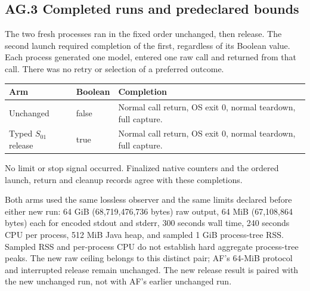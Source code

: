 \subsection*{AG.3 Completed runs and predeclared bounds}
The two fresh processes ran in the fixed order unchanged, then release.
The second launch required completion of the first, regardless of its
Boolean value. Each process generated one model, entered one raw call
and returned from that call. There was no retry or selection of a
preferred outcome.
\begin{center}\small
\begin{tabular}{@{}L{32mm}L{22mm}L{93mm}@{}}\toprule
Arm & Boolean & Completion\\\midrule
Unchanged & false & Normal call return, OS exit 0, normal teardown, full capture.\\[3pt]
Typed $S_{01}$ release & true & Normal call return, OS exit 0, normal teardown, full capture.\\\bottomrule
\end{tabular}
\end{center}
No limit or stop signal occurred. Finalized native counters and the
ordered launch, return and cleanup records agree with these completions.

Both arms used the same lossless observer and the same limits declared
before either new run: 64 GiB (68,719,476,736 bytes) raw output,
64 MiB (67,108,864 bytes) each for encoded stdout and stderr,
300 seconds wall time, 240 seconds CPU per process, 512 MiB Java heap,
and sampled 1 GiB process-tree RSS. Sampled RSS and per-process CPU do
not establish hard aggregate process-tree peaks. The new raw ceiling
belongs to this distinct pair; AF's 64-MiB protocol and interrupted
release remain unchanged. The new release result is paired with the new
unchanged run, not with AF's earlier unchanged run.

